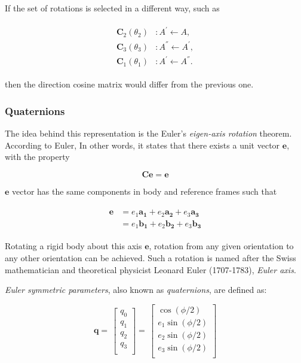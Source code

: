 If the set of rotations is selected in a different way, such as 

\begin{align}
\label{eqn:sequence2}
\begin{split}
{\bm{C}}_2(\theta_{2}) & :      A^{'} \leftarrow A   ,
\\
{\bm{C}}_3(\theta_{3}) & :      A^{''} \leftarrow A^{'}   ,
\\
{\bm{C}}_1(\theta_{1}) & :      A^{'} \leftarrow A^{''}  .
\end{split}
\end{align}

then the direction cosine matrix would differ from the previous one.

\subsubsection{Quaternions}

The idea behind this representation is the Euler's \emph{eigen-axis rotation} theorem. 
According to Euler,  In other words, it states that there exists a unit vector $\bm{e}$, with the property

\begin{equation}
\label{eqn:quat1}
\bm{C}\bm{e}= \bm{e}
\end{equation}

$\bm{e}$ vector has the same components in body and reference frames such that

\begin{align}
\label{eqn:quat2}
\begin{split}
\bm{e} & = e_1 \bm{a_1} + e_2 \bm{a_2} + e_3 \bm{a_3}
\\
& = e_1 \bm{b_1} + e_2 \bm{b_2} + e_3 \bm{b_3}
\end{split}
\end{align}
 
Rotating a rigid body about this axis $\bm{e}$, rotation from any given orientation to any other orientation can be achieved. 
Such a rotation is named after the Swiss mathematician and theoretical physicist Leonard Euler (1707-1783), \emph{Euler axis}.

\emph{Euler symmetric parameters}, also known as \emph{quaternions}, are defined as:
 
 \begin{equation}
 \label{eqn:quat3}
\bm{q}
=\,
\begin{bmatrix}
q_0\\[0.3em]
q_1\\[0.3em]
q_2\\[0.3em]
q_3\\[0.3em]
\end{bmatrix}
=\,
\begin{bmatrix}
\cos(\phi/2)\\[0.3em]
e_1 \sin(\phi/2)\\[0.3em]
e_2 \sin(\phi/2)\\[0.3em]
e_3 \sin(\phi/2)\\[0.3em]
\end{bmatrix}
\end{equation}
 
